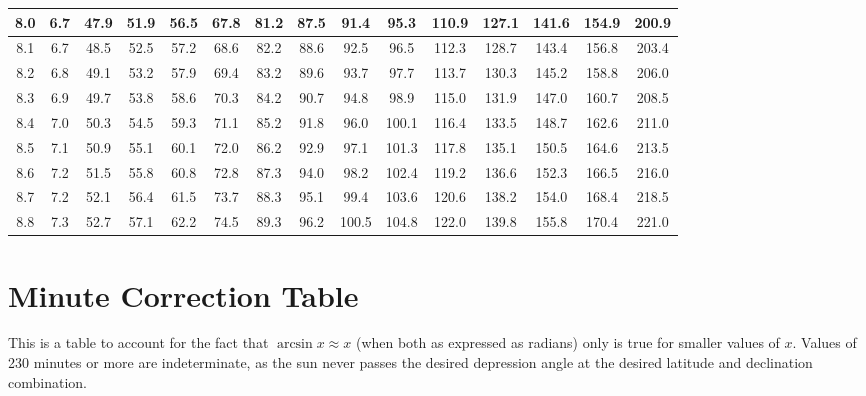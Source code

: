 \begin{footnotesize}
\begin{tabular}{c | c | c | c | c | c | c | c | c | c | c | c | c | c | c}
		8.0&6.7&47.9&51.9&56.5&67.8&81.2&87.5&91.4&95.3&110.9&127.1&141.6&154.9&200.9\\\hline
		8.1&6.7&48.5&52.5&57.2&68.6&82.2&88.6&92.5&96.5&112.3&128.7&143.4&156.8&203.4\\\hline
		8.2&6.8&49.1&53.2&57.9&69.4&83.2&89.6&93.7&97.7&113.7&130.3&145.2&158.8&206.0\\\hline
		8.3&6.9&49.7&53.8&58.6&70.3&84.2&90.7&94.8&98.9&115.0&131.9&147.0&160.7&208.5\\\hline
		8.4&7.0&50.3&54.5&59.3&71.1&85.2&91.8&96.0&100.1&116.4&133.5&148.7&162.6&211.0\\\hline
		8.5&7.1&50.9&55.1&60.1&72.0&86.2&92.9&97.1&101.3&117.8&135.1&150.5&164.6&213.5\\\hline
		8.6&7.2&51.5&55.8&60.8&72.8&87.3&94.0&98.2&102.4&119.2&136.6&152.3&166.5&216.0\\\hline
		8.7&7.2&52.1&56.4&61.5&73.7&88.3&95.1&99.4&103.6&120.6&138.2&154.0&168.4&218.5\\\hline
		8.8&7.3&52.7&57.1&62.2&74.5&89.3&96.2&100.5&104.8&122.0&139.8&155.8&170.4&221.0\\\hline
\end{tabular}\end{footnotesize}

\section{Minute Correction Table}

This is a table to account for the fact that $\arcsin x \approx x$ (when both as expressed as radians) only is true for smaller values of $x$. Values of 230 minutes or more are indeterminate, as the sun never passes the desired depression angle at the desired latitude and declination combination.

